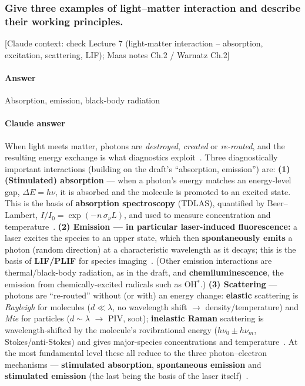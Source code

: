 \subsubsection{Give three examples of light--matter interaction and describe their working principles.}

{\color{gray}\footnotesize [Claude context: check Lecture 7 (light-matter interaction -- absorption, excitation, scattering, LIF); Maas notes Ch.2 / Warnatz Ch.2]}

\paragraph{Answer}

Absorption, emission, black-body radiation

{\color{istblue}
\paragraph{Claude answer}
When light meets matter, photons are \emph{destroyed}, \emph{created} or \emph{re-routed}, and the resulting energy exchange is what diagnostics exploit~\cite{lecture7}. Three diagnostically important interactions (building on the draft's ``absorption, emission'') are: \textbf{(1) (Stimulated) absorption} --- when a photon's energy matches an energy-level gap, $\Delta E = h\nu$, it is absorbed and the molecule is promoted to an excited state. This is the basis of \textbf{absorption spectroscopy} (TDLAS), quantified by Beer--Lambert, $I/I_0 = \exp(-n\,\sigma_\nu L)$, and used to measure concentration and temperature~\cite{lecture7,hitran}. \textbf{(2) Emission --- in particular laser-induced fluorescence:} a laser excites the species to an upper state, which then \textbf{spontaneously emits} a photon (random direction) at a characteristic wavelength as it decays; this is the basis of \textbf{LIF/PLIF} for species imaging~\cite{lecture7,crosley1983}. (Other emission interactions are thermal/black-body radiation, as in the draft, and \textbf{chemiluminescence}, the emission from chemically-excited radicals such as OH$^*$.) \textbf{(3) Scattering} --- photons are ``re-routed'' without (or with) an energy change: \textbf{elastic} scattering is \emph{Rayleigh} for molecules ($d \ll \lambda$, no wavelength shift $\to$ density/temperature) and \emph{Mie} for particles ($d \sim \lambda$ $\to$ PIV, soot); \textbf{inelastic Raman} scattering is wavelength-shifted by the molecule's rovibrational energy ($h\nu_0 \pm h\nu_m$, Stokes/anti-Stokes) and gives major-species concentrations and temperature~\cite{lecture7}. At the most fundamental level these all reduce to the three photon--electron mechanisms --- \textbf{stimulated absorption}, \textbf{spontaneous emission} and \textbf{stimulated emission} (the last being the basis of the laser itself)~\cite{lecture7}.
}




